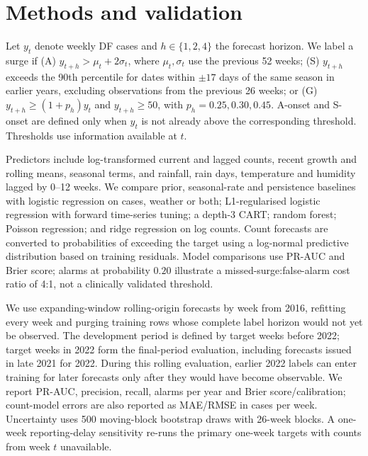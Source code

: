 \section{Methods and validation}
\label{sec:methods}
Let $y_t$ denote weekly DF cases and $h\in\{1,2,4\}$ the forecast horizon. We label a
surge if (A) $y_{t+h}>\mu_t+2\sigma_t$, where $\mu_t,\sigma_t$ use the previous 52
weeks; (S) $y_{t+h}$ exceeds the 90th percentile for dates within $\pm17$ days of the
same season in earlier years, excluding observations from the previous 26 weeks; or
(G) $y_{t+h}\ge(1+p_h)y_t$ and $y_{t+h}\ge50$, with $p_h=0.25,0.30,0.45$. A-onset and
S-onset are defined only when $y_t$ is not already above the corresponding threshold.
Thresholds use information available at $t$.

Predictors include log-transformed current and lagged counts, recent growth and rolling
means, seasonal terms, and rainfall, rain days, temperature and humidity lagged by
0--12 weeks. We compare prior, seasonal-rate and persistence baselines with logistic
regression on cases, weather or both; L1-regularised logistic regression with forward
time-series tuning; a depth-3 CART; random forest; Poisson regression; and ridge
regression on log counts. Count forecasts are converted to probabilities of exceeding
the target using a log-normal predictive distribution based on training residuals.
Model comparisons use PR-AUC and Brier score; alarms at probability $0.20$ illustrate
a missed-surge:false-alarm cost ratio of 4:1, not a clinically validated threshold.

We use expanding-window rolling-origin forecasts by week from 2016, refitting every
week and purging training rows whose complete label horizon would not yet be observed.
The development period is defined by target weeks before 2022; target weeks in 2022
form the final-period evaluation, including forecasts issued in late 2021 for 2022.
During this rolling evaluation, earlier 2022 labels can enter training for later
forecasts only after they would have become observable.
We report PR-AUC, precision, recall, alarms per year and Brier score/calibration;
count-model errors are also reported as MAE/RMSE in cases per week. Uncertainty uses
500 moving-block bootstrap draws with 26-week blocks. A one-week reporting-delay
sensitivity re-runs the primary one-week targets with counts from week $t$ unavailable.

